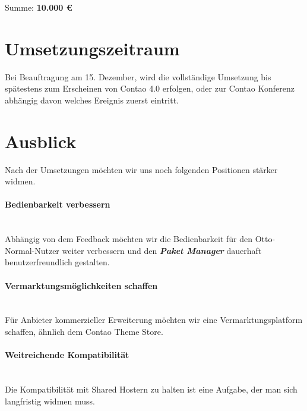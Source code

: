 \documentclass[
paper=a4,
draft=false,%
fontsize=10pt%
]{scrartcl}
\newcommand{\packageManager}{\textbf{\textit{Paket Manager}}}
\begin{document}
\hfill Summe: \textbf{10.000 \euro}

%
%

\section{Umsetzungszeitraum}
\label{sec:timeline}

Bei Beauftragung am 15. Dezember, wird die vollständige Umsetzung bis spätestens zum Erscheinen von Contao 4.0 erfolgen, oder zur Contao Konferenz abhängig davon welches Ereignis zuerst eintritt.

\newpage

%
%

\section{Ausblick}
\label{sec:forecast}

Nach der Umsetzungen möchten wir uns noch folgenden Positionen stärker widmen.

\paragraph{Bedienbarkeit verbessern} ~\\
Abhängig von dem Feedback möchten wir die Bedienbarkeit für den Otto-Normal-Nutzer weiter verbessern und den \packageManager{} dauerhaft benutzerfreundlich gestalten.

\paragraph{Vermarktungsmöglichkeiten schaffen} ~\\
Für Anbieter kommerzieller Erweiterung möchten wir eine Vermarktungsplatform schaffen, ähnlich dem Contao Theme Store.

\paragraph{Weitreichende Kompatibilität} ~\\
Die Kompatibilität mit  Shared Hostern zu halten ist eine Aufgabe, der man sich langfristig widmen muss.
\end{document}
